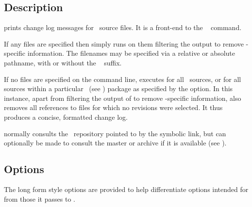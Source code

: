 \subsection*{Description}
 prints change log messages for \aipspp\ source files.  It is a
front-end to the \rcs\  command.

If any files are specified then  simply runs  on them
filtering the output to remove \rcs-specific information.  The filenames
may be specified via a relative or absolute pathname, with or without the
\rcs\  suffix.

If no files are specified on the command line,  executes
 for all \aipspp\ sources, or for all sources within a
particular \aipspp\ (see ) package as specified by the
 option.  In this instance, apart from filtering the output of
 to remove \rcs-specific information,  also removes
all references to files for which no revisions were selected.  It thus
produces a concise, formatted change log.

 normally consults the \rcs\ repository pointed to by the
 symbolic link, but can optionally be made to consult the
master or archive if it is available (see ).

\subsection*{Options}

The long form  style options are provided to help differentiate
options intended for  from those it passes to .


